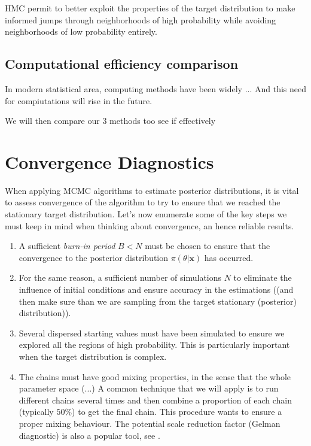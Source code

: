 \documentclass[11pt,a4paper,openany ]{book}
\begin{document}
HMC permit to better exploit the properties of
the target distribution to make informed jumps through neighborhoods of high probability while avoiding neighborhoods of low probability entirely.


\subsection{Computational efficiency comparison}

In modern statistical area, computing methods have been widely ... 
And this need for compiutations will rise in the future. 

We will then compare our 3 methods too see if effectively


\section{Convergence Diagnostics}

When applying MCMC algorithms to estimate posterior distributions, it is vital to assess convergence of the algorithm to try to ensure that we reached the stationary target distribution. Let's now enumerate some of the key steps we must keep in mind when thinking about convergence, an hence reliable results.

\begin{enumerate}
	\item A sufficient \emph{burn-in period} $B<N$ must be chosen to ensure that the convergence to the posterior distribution $\pi(\theta|\boldsymbol{x})$ has occurred. 
	\item For the same reason, a sufficient number of simulations $N$ to eliminate the influence of initial conditions and ensure accuracy in the estimations ((and then make sure than we are sampling from the target stationary (posterior) distribution)).
	\item Several dispersed starting values must have been simulated to ensure we explored all the regions of high probability. This is particularly important when the target distribution is complex.
	\item\label{convdiag4} The chains must have good mixing properties, in the sense that the whole parameter space (...) 
	A common technique that we will apply is to run different chains several times and then combine a proportion of each chain (typically $50\%$) to get the final chain. This procedure wants to ensure a proper mixing behaviour. 
	The potential scale reduction factor (Gelman diagnostic) is also a popular tool, see .
\end{enumerate}
\end{document}
